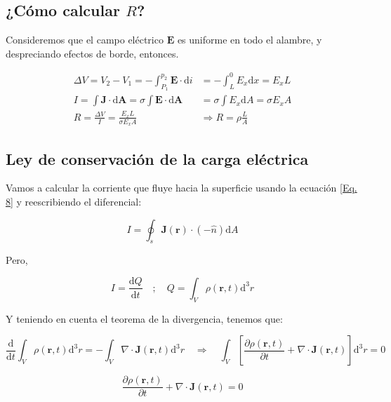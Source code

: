 \documentclass[11pt,fleqn]{book}
\renewcommand{\vec}[1]{\mathbf{#1}}
\begin{document}
\subsection*{¿Cómo calcular $R$?}

Consideremos que el campo eléctrico $\vec{E}$ es uniforme en todo el alambre, y despreciando efectos de borde, entonces.

\begin{equation}
\begin{split}
      \Delta V=V_{2}-V_{1}=-\int_{P_{1}}^{p_{2}} \vec{E}\cdot\mathrm{d}i&=-\int_{L}^{0} E_{x}\mathrm{d}x=E_{x}L\\
      I=\int\vec{J}\cdot\mathrm{d}\vec{A}=\sigma\int\vec{E}\cdot\mathrm{d}\vec{A}&=\sigma\int E_{x}\mathrm{d}A=\sigma E_{x}A\\
      R=\frac{\Delta V}{I}=\frac{E_{x}L}{\sigma E_{x}A} & \Longrightarrow R=\rho\frac{L}{A}
\end{split}
\end{equation}
 
\subsection{Ley de conservación de la carga eléctrica}

Vamos a calcular la corriente que fluye hacia la superficie usando la ecuación \ref{Eq. 8} y reescribiendo el diferencial:

\begin{equation*}
    I=\oint_{s} \vec{J}(\vec{r}) \cdot (-\hat{n}) \mathrm{d}A
\end{equation*}
 
Pero,

\begin{equation*}
    I=\frac{\mathrm{d}Q}{\mathrm{d}t} \quad ; \quad Q=\int_{V} \rho(\vec{r},t) \mathrm{d}^{3} r
\end{equation*}

Y teniendo en cuenta el teorema de la divergencia, tenemos que:

\begin{equation*}
    \frac{\mathrm{d}}{\mathrm{d}t}\int_{V} \rho(\vec{r},t) \mathrm{d}^{3}r=-\int_{V} \nabla\cdot\vec{J}(\vec{r},t) \mathrm{d}^{3}r \quad\Longrightarrow\quad
    \int_{V}\left[\frac{\partial\rho(\vec{r},t)}{\partial t}+\nabla\cdot\vec{J}(\vec{r},t)\right]\mathrm{d}^{3}r=0
  \end{equation*}

\begin{equation}
    \frac{\partial\rho(\vec{r},t)}{\partial t}+\nabla\cdot\vec{J}(\vec{r},t)=0
    \label{Eq. 1.10}
\end{equation}
\end{document}
